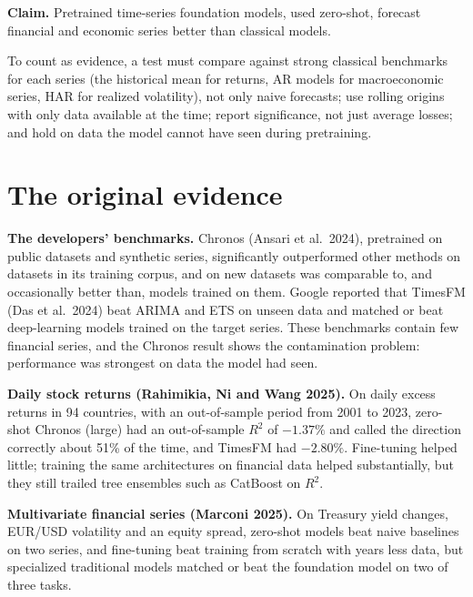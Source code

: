 \begin{callout}
\textbf{Claim.} Pretrained time-series foundation models, used zero-shot, forecast financial and economic series better than classical models.
\end{callout}

To count as evidence, a test must compare against strong classical benchmarks for each series (the historical mean for returns, AR models for macroeconomic series, HAR for realized volatility), not only naive forecasts; use rolling origins with only data available at the time; report significance, not just average losses; and hold on data the model cannot have seen during pretraining.

\section{The original evidence}
\label{sec:21-evidence}

\textbf{The developers' benchmarks.} Chronos (Ansari et al.\ 2024), pretrained on public datasets and synthetic series, significantly outperformed other methods on datasets in its training corpus, and on new datasets was comparable to, and occasionally better than, models trained on them. Google reported that TimesFM (Das et al.\ 2024) beat ARIMA and ETS on unseen data and matched or beat deep-learning models trained on the target series. These benchmarks contain few financial series, and the Chronos result shows the contamination problem: performance was strongest on data the model had seen.

\textbf{Daily stock returns (Rahimikia, Ni and Wang 2025).} On daily excess returns in 94 countries, with an out-of-sample period from 2001 to 2023, zero-shot Chronos (large) had an out-of-sample $R^2$ of $-1.37\%$ and called the direction correctly about 51\% of the time, and TimesFM had $-2.80\%$. Fine-tuning helped little; training the same architectures on financial data helped substantially, but they still trailed tree ensembles such as CatBoost on $R^2$.

\textbf{Multivariate financial series (Marconi 2025).} On Treasury yield changes, EUR/USD volatility and an equity spread, zero-shot models beat naive baselines on two series, and fine-tuning beat training from scratch with years less data, but specialized traditional models matched or beat the foundation model on two of three tasks.

